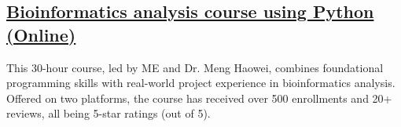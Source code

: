 \subsection*{\href{https://www.bioinfo.info/p/t_pc/goods_pc_detail/goods_detail/course_2SvfNlIVzrKfOcexHk9Nute5Bhd}{Bioinformatics analysis course using Python (Online)}}

This 30-hour course, led by ME and Dr. Meng Haowei, 
combines foundational programming skills with real-world project experience in bioinformatics analysis. 
Offered on two platforms, the course has received over 500 enrollments and 20+ reviews, all being 5-star ratings (out of 5).